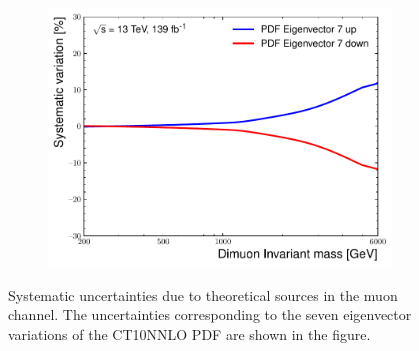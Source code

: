 \begin{figure}[h!]
\begin{subfigure}[b]{0.42\textwidth}
        \includegraphics[width=\textwidth]{figures/analysis/datamc/Uncertainties/theory/mm/backgroundTemplate_KF_PDF_EV7.pdf}
        \label{fig:uncert:mmpdfvar7}
    \end{subfigure}
    \caption{Systematic uncertainties due to theoretical sources in the muon channel. The uncertainties corresponding to the seven eigenvector variations of the CT10NNLO PDF are shown in the figure.}
    \label{fig:ucnert:mmpdfvar}
\end{figure}

